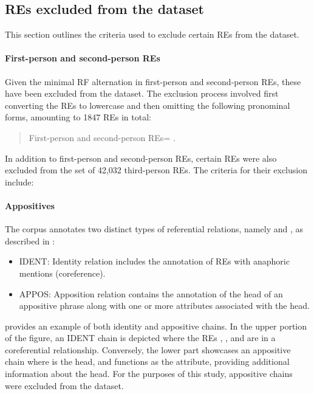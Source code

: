 \subsection{REs excluded from the \wsj dataset}\label{subsec:chap4wsjexclusion}

This section outlines the criteria used to exclude certain REs from the \wsj dataset.

\paragraph*{First-person and second-person REs} 
Given the minimal RF alternation in first-person and second-person REs, these have been excluded from the dataset. The exclusion process involved first converting the REs to lowercase and then omitting the following pronominal forms, amounting to 1847 REs in total:

\begin{quote}
	First-person and second-person REs= .
\end{quote}

In addition to first-person and second-person REs, certain REs were also excluded from the set of 42,032 third-person REs. The criteria for their exclusion include:

\paragraph*{Appositives} 
The \onto corpus annotates two distinct types of referential relations, namely  and , as described in \citep{weischedel2012ontonotes}:

\begin{itemize}
	\item IDENT: Identity relation includes the annotation of REs with anaphoric mentions (coreference).
	\item APPOS: Apposition relation contains the annotation of the head of an appositive phrase along with one or more attributes associated with the head.
\end{itemize}

 provides an example of both identity and appositive chains. In the upper portion of the figure, an IDENT chain is depicted where the REs , , and  are in a coreferential relationship. Conversely, the lower part showcases an appositive chain where  is the head, and  functions as the attribute, providing additional information about the head. For the purposes of this study, appositive chains were excluded from the dataset.

